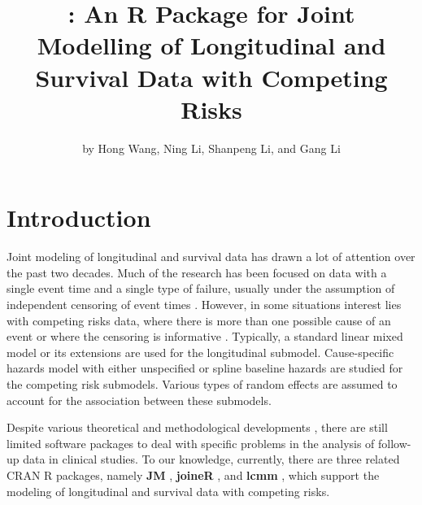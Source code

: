 
\title{: An R Package for Joint Modelling of
Longitudinal and Survival Data with Competing Risks}
\author{by Hong Wang, Ning Li, Shanpeng Li, and Gang Li}

\maketitle


%

\section{Introduction}
Joint modeling of  longitudinal and survival data has drawn a lot of attention over the past two decades. Much of the research has been focused on data with a single event time and a single type of failure, usually under the assumption of independent censoring of event times \citep{tsiatis2004joint}. However, in some situations interest lies with competing risks data, where there is more than one possible cause of an event or where the censoring is informative \citep{williamson2008joint}. Typically, a standard linear mixed model or its extensions are used for the longitudinal submodel. Cause-specific hazards model with either unspecified  or spline baseline hazards are studied for the competing risk submodels.  Various types of random effects are assumed to account for the association between these submodels.

Despite various theoretical and methodological developments \citep{hickey2018joint,papageorgiou2019overview}, there are still limited software packages to deal with specific problems in the analysis of follow-up data in clinical studies. To our knowledge, currently, there are three related  CRAN R packages, namely \textbf{JM} \citep{rizopoulos2012joint}, \textbf{joineR} \citep{williamson2008joint}, and \textbf{lcmm} \citep{proust2017estimation}, which support the modeling of longitudinal and survival data with competing risks.

